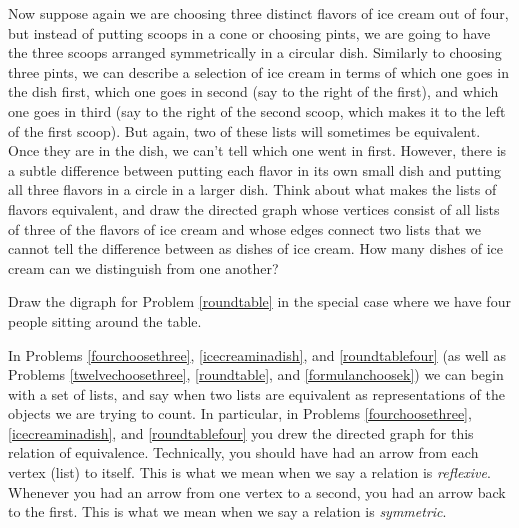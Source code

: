 \itemi Now suppose again we are choosing three distinct flavors of
ice cream out of four, but instead of putting scoops in a cone or
choosing pints, we are going to have the three scoops arranged
symmetrically in a circular dish.  Similarly to choosing three
pints, we can describe a selection of ice cream in terms of which
one goes in the dish first, which one goes in second (say to the
right of the first), and which one goes in third (say to the right
of the second scoop, which makes it to the left of the first
scoop).  But again, two of these lists will sometimes be
equivalent.  Once they are in the dish, we can't tell which one
went in first.  However, there is a subtle difference between
putting each flavor in its own small dish and putting all three
flavors in a circle in a larger dish.  Think about what makes the
lists of flavors equivalent, and draw the directed graph whose
vertices consist of all lists of     three of the flavors of ice
cream and whose edges connect two lists that we cannot tell the
difference between as dishes of ice cream.  How many dishes of ice
cream can we distinguish from one another?\label{icecreaminadish}
\solution{\begin{center}
\mbox{\psfig{figure=icecreamindish.eps,%
}}\end{center}We can distinguish eight different dishes of ice
cream.}


\item Draw the digraph for Problem \ref{roundtable} in the
special case where we have four people sitting around the table.
\label{roundtablefour} 
\solution{\begin{center}
\mbox{\psfig{figure=4AROUNDATABLE.eps,%
}}\end{center}}
\ep

In Problems \ref{fourchoosethree}, \ref{icecreaminadish}, and
\ref{roundtablefour} (as well as Problems
\ref{twelvechoosethree}, \ref{roundtable}, and
\ref{formulanchoosek}) we can begin with a
set of lists, and say when two lists are equivalent as
representations of the objects we are trying to count.  In
particular, in Problems
\ref{fourchoosethree}, \ref{icecreaminadish}, and
\ref{roundtablefour} you drew the directed graph for this
relation of equivalence.  Technically, you should have had an
arrow from each vertex (list) to itself.  This is what we mean
when we say a relation is {\em reflexive}.  Whenever you had an
arrow from one vertex to a second, you had an arrow back to the
first.  This is what we mean when we say a relation is {\em
symmetric}.    

